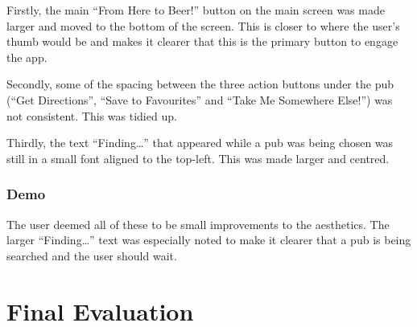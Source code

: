 \documentclass{report}
\begin{document}
Firstly, the main ``From Here to Beer!'' button on the main screen
was made larger and moved to the bottom of the screen. This is
closer to where the user's thumb would be and makes it clearer
that this is the primary button to engage the app.

Secondly, some of the spacing between the three action buttons under
the pub (``Get Directions'', ``Save to Favourites'' and ``Take Me
Somewhere Else!'') was not consistent. This was tidied up.

Thirdly, the text ``Finding\dots'' that appeared while a pub
was being chosen was still in a small font aligned to the top-left.
This was made larger and centred.

\subsection{Demo}

The user deemed all of these to be small improvements to the aesthetics.
The larger ``Finding\dots'' text was especially noted to make
it clearer that a pub is being searched and the user should wait.

\chapter{Final Evaluation}
\label{chapter:evaluation}
\end{document}
